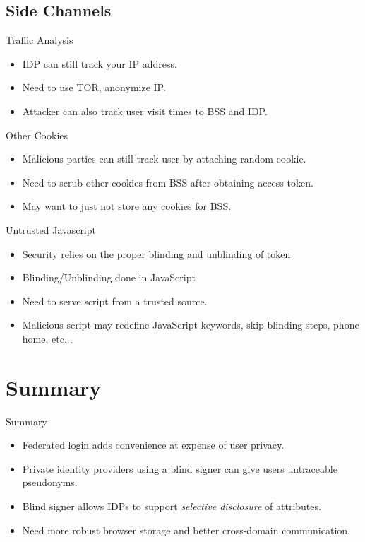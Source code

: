 \documentclass[handout]{beamer}
\begin{document}
\subsection{Side Channels}

\begin{frame}{Traffic Analysis}
  \begin{itemize}
    \item<1-> IDP can still track your IP address.
    \item<2-> Need to use TOR, anonymize IP.
    \item<3-> Attacker can also track user visit times to BSS and IDP.
  \end{itemize}
\end{frame}

\begin{frame}{Other Cookies}
  \begin{itemize}
    \item<1-> Malicious parties can still track user by attaching random cookie.
    \item<2-> Need to scrub other cookies from BSS after obtaining access token.
    \item<3-> May want to just not store any cookies for BSS.
  \end{itemize}
\end{frame}

\begin{frame}{Untrusted Javascript}
  \begin{itemize}
    \item<1-> Security relies on the proper blinding and unblinding of token
    \item<2-> Blinding/Unblinding done in JavaScript
    \item<3-> Need to serve script from a trusted source.
    \item<4-> Malicious script may redefine JavaScript keywords, skip blinding
    steps, phone home, etc...
  \end{itemize}
\end{frame}

\section*{Summary}

\begin{frame}{Summary}
  \begin{itemize}
    \item<1-> Federated login adds convenience at expense of user privacy.
    \item<2-> Private identity providers using a blind signer can give users
    untraceable pseudonyms.
    \item<3-> Blind signer allows IDPs to support \emph{selective disclosure} of
    attributes.
    \item<4-> Need more robust browser storage and better cross-domain
    communication.
  \end{itemize}
\end{frame}
\end{document}
